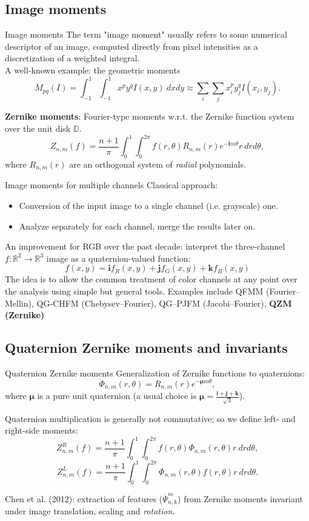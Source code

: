 \documentclass{beamer}
\newcommand{\R}{\mathbb{R}}
\newcommand{\D}{\mathbb{D}}
\newcommand{\qi}{\textbf{i}}
\newcommand{\qj}{\textbf{j}}
\newcommand{\qk}{\textbf{k}}
\newcommand{\qmu}{\boldsymbol{\mu}}
\def\R{{\mathbb R}}
\def\D{{\mathbb D}}
\begin{document}
\subsection{Image moments}
\begin{frame}{Image moments}
\vskip 3mm
The term "image moment" usually refers to some numerical descriptor of an image, computed directly from pixel intensities as a discretization of a weighted integral.\\
A well-known example: the geometric moments $$M_{pq}(I) = \int_{-1}^1 \int_{-1}^1 x^p y^q I(x,y)\ dx dy \approx
\sum_i \sum_j x_i^p y_j^q I(x_i,y_j).$$

\textbf{Zernike moments}: Fourier-type moments w.r.t. the Zernike function system over the unit disk $\D$.
$$Z_{n,m}(f) = \frac{n+1}{\pi}\int_0^1\int_0^{2\pi}f(r,\theta)R_{n,m}(r)e^{-\qi m\theta} r\ dr d\theta,$$ where $R_{n,m}(r)$ are an orthogonal system of \emph{radial} polynomials.
\end{frame}


\begin{frame}{Image moments for multiple channels}
\vskip 3mm
Classical approach:
\begin{itemize}
    \item Conversion of the input image to a single channel (i.e. grayscale) one.
    \item Analyze separately for each channel, merge the results later on.
\end{itemize}
An improvement for RGB over the past decade: interpret the three-channel $f : \R^2 \rightarrow \R^3$ image as a quaternion-valued function:
$$f(x,y) = \qi f_R(x,y) + \qj f_G(x,y) + \qk f_B(x,y)$$
The idea is to allow the common treatment of color channels at any point over the analysis using simple but general tools.
Examples include QFMM (Fourier--Mellin), QG-CHFM (Chebysev--Fourier), QG--PJFM (Jacobi--Fourier), \textbf{QZM (Zernike)}
\end{frame}

\subsection{Quaternion Zernike moments and invariants}
\begin{frame}{Quaternion Zernike moments}
\vskip 3mm
Generalization of Zernike functions to quaternions: $$\Phi_{n,m}(r,\theta) = R_{n,m}(r)e^{-\qmu m \theta},$$ where $\qmu$ is a pure unit quaternion (a usual choice is $\qmu = \frac{\qi + \qj + \qk}{\sqrt{3}}$).

Quaternion multiplication is generally not commutative; so we define left- and right-side moments:
$$Z^R_{n,m}(f) = \frac{n+1}{\pi}\int_0^1\int_0^{2\pi}f(r,\theta)\Phi_{n,m}(r,\theta)r\ dr d\theta,$$
$$Z^L_{n,m}(f) = \frac{n+1}{\pi}\int_0^1\int_0^{2\pi}\Phi_{n,m}(r,\theta)f(r,\theta)r\ dr d\theta.$$

Chen et al. (2012): extraction of features ($\overline{\Psi}_{n,k}^m$) from Zernike moments invariant under image translation, scaling and \emph{rotation}. 
\end{frame}
\end{document}
